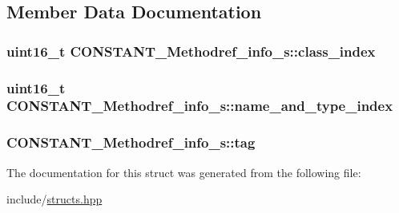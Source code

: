 \subsection{Member Data Documentation}
\hypertarget{structCONSTANT__Methodref__info__s_a20509be0dbe4f181a490951022b76113}{
\subsubsection[{class\+\_\+index}]{\setlength{\rightskip}{0pt plus 5cm}uint16\+\_\+t C\+O\+N\+S\+T\+A\+N\+T\+\_\+\+Methodref\+\_\+info\+\_\+s\+::class\+\_\+index}}\label{structCONSTANT__Methodref__info__s_a20509be0dbe4f181a490951022b76113}
\hypertarget{structCONSTANT__Methodref__info__s_ac669a727a4485e90f35bffd37888b7d2}{
\subsubsection[{name\+\_\+and\+\_\+type\+\_\+index}]{\setlength{\rightskip}{0pt plus 5cm}uint16\+\_\+t C\+O\+N\+S\+T\+A\+N\+T\+\_\+\+Methodref\+\_\+info\+\_\+s\+::name\+\_\+and\+\_\+type\+\_\+index}}\label{structCONSTANT__Methodref__info__s_ac669a727a4485e90f35bffd37888b7d2}
\hypertarget{structCONSTANT__Methodref__info__s_ac808580c07823c6e5413491b0b297a20}{
\subsubsection[{tag}]{ C\+O\+N\+S\+T\+A\+N\+T\+\_\+\+Methodref\+\_\+info\+\_\+s\+::tag}}\label{structCONSTANT__Methodref__info__s_ac808580c07823c6e5413491b0b297a20}


The documentation for this struct was generated from the following file\+:\begin{DoxyCompactItemize}
\item 
include/\hyperlink{structs_8hpp}{structs.\+hpp}\end{DoxyCompactItemize}
